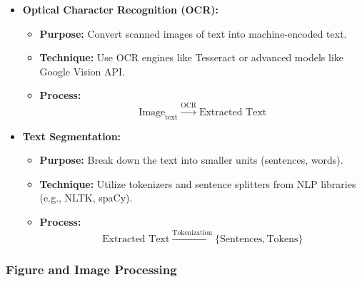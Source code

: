 \documentclass[12pt]{article}
\begin{document}
\begin{itemize}
    \item \textbf{Optical Character Recognition (OCR):}
    \begin{itemize}
        \item \textbf{Purpose:} Convert scanned images of text into machine-encoded text.
        \item \textbf{Technique:} Use OCR engines like Tesseract or advanced models like Google Vision API.
        \item \textbf{Process:}
        \[
        \text{Image}_{\text{text}} \xrightarrow{\text{OCR}} \text{Extracted Text}
        \]
    \end{itemize}
    \item \textbf{Text Segmentation:}
    \begin{itemize}
        \item \textbf{Purpose:} Break down the text into smaller units (sentences, words).
        \item \textbf{Technique:} Utilize tokenizers and sentence splitters from NLP libraries (e.g., NLTK, spaCy).
        \item \textbf{Process:}
        \[
        \text{Extracted Text} \xrightarrow{\text{Tokenization}} \{\text{Sentences}, \text{Tokens}\}
        \]
    \end{itemize}
\end{itemize}

\subsubsection{Figure and Image Processing}
\end{document}
